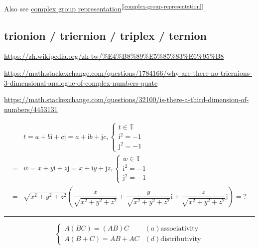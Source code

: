 \documentclass[
]{book}
\theoremstyle{definition}
\theoremstyle{definition}
\theoremstyle{definition}
\theoremstyle{definition}
\theoremstyle{remark}
\begin{document}
Also see \protect\hyperlink{complex-group-representation}{complex group representation}\textsuperscript{{[}\ref{complex-group-representation}{]}}.

\hypertarget{trionion-triernion-triplex-ternion}{%
\subsection{trionion / triernion / triplex / ternion}\label{trionion-triernion-triplex-ternion}}

\url{https://zh.wikipedia.org/zh-tw/\%E4\%B8\%89\%E5\%85\%83\%E6\%95\%B8}

\url{https://math.stackexchange.com/questions/1784166/why-are-there-no-triernions-3-dimensional-analogue-of-complex-numbers-quate}

\url{https://math.stackexchange.com/questions/32100/is-there-a-third-dimension-of-numbers/4453131}

\[
\begin{aligned}
 & t=a+b\mathrm{i}+c\mathrm{j}=a+\mathrm{i}b+\mathrm{j}c,\begin{cases}
t\in\mathbb{T}\\
\mathrm{i}^{2}=-1\\
\mathrm{j}^{2}=-1
\end{cases}\\
= & w=x+y\mathrm{i}+z\mathrm{j}=x+\mathrm{i}y+\mathrm{j}z,\begin{cases}
w\in\mathbb{T}\\
\mathrm{i}^{2}=-1\\
\mathrm{j}^{2}=-1
\end{cases}\\
= & \sqrt{x^{2}+y^{2}+z^{2}}\left(\dfrac{x}{\sqrt{x^{2}+y^{2}+z^{2}}}+\dfrac{y}{\sqrt{x^{2}+y^{2}+z^{2}}}\mathrm{i}+\dfrac{z}{\sqrt{x^{2}+y^{2}+z^{2}}}\mathrm{j}\right)=?
\end{aligned}
\]

\begin{center}\rule{0.5\linewidth}{0.5pt}\end{center}

\[
\begin{cases}
A\left(BC\right)=\left(AB\right)C & \left(a\right)\text{associativity}\\
A\left(B+C\right)=AB+AC & \left(d\right)\text{distributivity}
\end{cases}
\]
\end{document}
